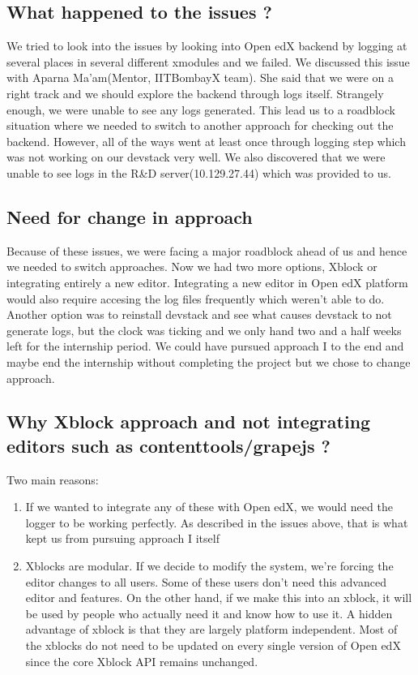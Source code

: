 \subsection{What happened to the issues ?}
We tried to look into the issues by looking into Open edX backend by logging at several places in
several different xmodules and we failed. We discussed this issue with Aparna Ma’am(Mentor,
IITBombayX team). She said that we were on a right track and we should explore the backend
through logs itself. Strangely enough, we were unable to see any logs generated. This lead us to a
roadblock situation where we needed to switch to another approach for checking out the backend.
However, all of the ways went at least once through logging step which was not working on our
devstack very well. We also discovered that we were unable to see logs in the  R\&D
server(10.129.27.44) which was provided to us.
\subsection{Need for change in approach}
Because of these issues, we were facing a major roadblock ahead of us and hence we needed to
switch approaches. Now we had two more options, Xblock or integrating entirely a new editor.
Integrating a new editor in Open edX platform would also require accesing the log files frequently which weren't able to do.
 Another option was to reinstall devstack and see what causes devstack to not generate logs, but the clock was ticking and
we only hand two and a half weeks left for the internship period. We could have pursued approach I to the end
and maybe end the internship without completing the project but we chose to change approach.
\subsection{Why Xblock approach and not integrating editors such as
contenttools/grapejs ?}
Two main reasons:
\begin{enumerate}
\item If we wanted to integrate any of these with Open edX, we would need the logger to be working
perfectly. As described in the issues above, that is what kept us from pursuing approach I itself
\item Xblocks are modular. If we decide to modify the system, we’re forcing the editor changes to all
users. Some of these users don’t  need this advanced editor and features. On the
other hand, if we make this into an xblock, it will be used by people who actually need it and know
how to use it. A hidden advantage of xblock is that they are largely platform independent.
Most of the xblocks do not need to be updated on every single version of Open edX since the core
Xblock API remains unchanged.
\end{enumerate}


